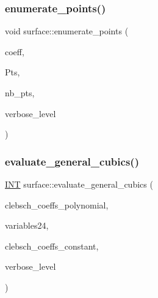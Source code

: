 \mbox{\label{classsurface_adc79cf9249a0bd3350b35a9c6bdd94d8}} 
\subsubsection{\texorpdfstring{enumerate\+\_\+points()}{enumerate\_points()}}
{\footnotesize\ttfamily void surface\+::enumerate\+\_\+points (\begin{DoxyParamCaption}\item[{\mbox{\hyperlink{galois_8h_a09fddde158a3a20bd2dcadb609de11dc}{I\+NT}} $\ast$}]{coeff,  }\item[{\mbox{\hyperlink{galois_8h_a09fddde158a3a20bd2dcadb609de11dc}{I\+NT}} $\ast$}]{Pts,  }\item[{\mbox{\hyperlink{galois_8h_a09fddde158a3a20bd2dcadb609de11dc}{I\+NT}} \&}]{nb\+\_\+pts,  }\item[{\mbox{\hyperlink{galois_8h_a09fddde158a3a20bd2dcadb609de11dc}{I\+NT}}}]{verbose\+\_\+level }\end{DoxyParamCaption})}

\mbox{\label{classsurface_a256bf8ccc90e48eca4f4f785a9c5e187}} 
\subsubsection{\texorpdfstring{evaluate\+\_\+general\+\_\+cubics()}{evaluate\_general\_cubics()}}
{\footnotesize\ttfamily \mbox{\hyperlink{galois_8h_a09fddde158a3a20bd2dcadb609de11dc}{I\+NT}} surface\+::evaluate\+\_\+general\+\_\+cubics (\begin{DoxyParamCaption}\item[{\mbox{\hyperlink{galois_8h_a09fddde158a3a20bd2dcadb609de11dc}{I\+NT}} $\ast$}]{clebsch\+\_\+coeffs\+\_\+polynomial,  }\item[{\mbox{\hyperlink{galois_8h_a09fddde158a3a20bd2dcadb609de11dc}{I\+NT}} $\ast$}]{variables24,  }\item[{\mbox{\hyperlink{galois_8h_a09fddde158a3a20bd2dcadb609de11dc}{I\+NT}} $\ast$}]{clebsch\+\_\+coeffs\+\_\+constant,  }\item[{\mbox{\hyperlink{galois_8h_a09fddde158a3a20bd2dcadb609de11dc}{I\+NT}}}]{verbose\+\_\+level }\end{DoxyParamCaption})}

